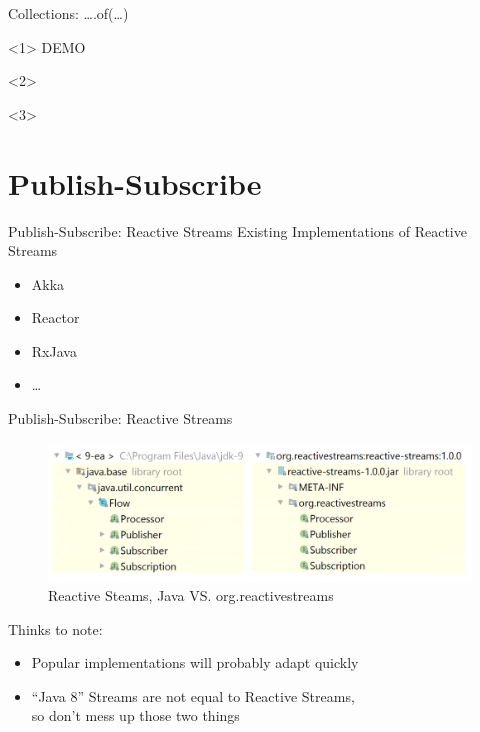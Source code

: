 \begin{frame}[fragile]{Collections: \dots.of(\dots)}
\begin{onlyenv}<1>
	\fontsize{20}{0}\selectfont
	\hfill DEMO \hfill
\end{onlyenv}
\begin{onlyenv}<2>
	
\end{onlyenv}
\begin{onlyenv}<3>
	
\end{onlyenv}
\end{frame}

\section{Publish-Subscribe}

\begin{frame}{Publish-Subscribe: Reactive Streams}
Existing Implementations of Reactive Streams
	\begin{itemize}
		\item Akka
		\item Reactor
		\item RxJava
		\item \dots
	\end{itemize}
\end{frame}

\begin{frame}{Publish-Subscribe: Reactive Streams}
	\begin{figure}[h]
		\centering
		\includegraphics[width=\textwidth]{./figures/reactiveStreams.png}
		\caption{Reactive Steams, Java VS. org.reactivestreams}
	\end{figure}
	Thinks to note:
	\begin{itemize}
		\item Popular implementations will probably adapt quickly 
		\item \enquote{Java 8} Streams are not equal to Reactive Streams,\\
				so don't mess up those two things
	\end{itemize}
\end{frame}

